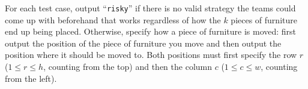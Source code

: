 
    For each test case, output ``\texttt{risky}'' if there is no valid strategy the teams could come up with
    beforehand that works regardless of how the $k$ pieces of
    furniture end up being placed.
    Otherwise, specify how a piece of furniture is moved:
    first output the position of the piece of furniture you move and then output the position where it should be moved to.
    Both positions must first specify the row $r$ ($1\leq r \leq h$, counting
    from the top) and then
    the column $c$ ($1\leq c\leq w$, counting from the left).

